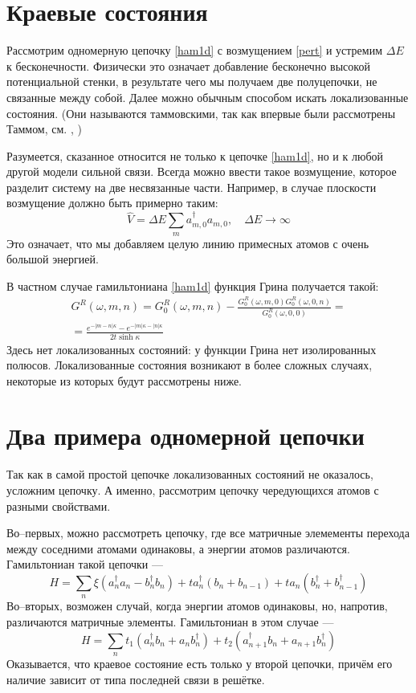 \section{Краевые состояния}
Рассмотрим одномерную цепочку \eqref{ham1d} с возмущением \eqref{pert} и устремим $\Delta E$
к бесконечности. Физически это означает добавление бесконечно высокой потенциальной стенки,
в результате чего мы получаем две полуцепочки, не связанные между собой. Далее можно 
обычным способом искать локализованные состояния. (Они называются таммовскими, так 
как впервые были рассмотрены Таммом, см. \cite{Tamm1933}, \cite{Shockley1939})

Разумеется, сказанное относится не только к цепочке \eqref{ham1d}, но и к любой другой модели
сильной связи. Всегда можно ввести такое возмущение, которое разделит систему на две
несвязанные части. Например, в случае плоскости возмущение должно быть примерно таким:
\begin{equation}
	\hat{V} = \Delta E \sum_m a^\dagger_{m,0} a_{m,0}, \quad \Delta E \to \infty
\end{equation}
Это означает, что мы добавляем целую линию примесных атомов с очень большой энергией.

В частном случае гамильтониана \eqref{ham1d} функция Грина получается такой:
\begin{multline}
	G^R(\omega, m,n) = G^R_0(\omega, m,n) - 
		\frac{G^R_0(\omega, m,0)G^R_0(\omega, 0, n)}{G^R_0(\omega,0,0)} = \\
		= \frac{e^{-|m-n|\kappa} - e^{-|m|\kappa- |n|\kappa}}{2t\sinh \kappa}
\end{multline}
Здесь нет локализованных состояний: у функции Грина нет изолированных полюсов. Локализованные
состояния возникают в более сложных случаях, некоторые из которых будут рассмотрены ниже.

\section{Два примера одномерной цепочки}
Так как в самой простой цепочке локализованных состояний не оказалось, усложним цепочку.
А именно, рассмотрим цепочку чередующихся атомов с разными свойствами. 

Во--первых, можно рассмотреть цепочку, где все матричные элемементы перехода между 
соседними атомами одинаковы, а энергии атомов различаются. Гамильтониан такой цепочки ---
\begin{equation}
	H = \sum_n \xi(a_n^\dagger a_n - b_n^\dagger b_n) + ta_n^\dagger(b_n + b_{n-1}) +
			ta_n(b_n^\dagger + b_{n-1}^\dagger)
\end{equation}
Во--вторых, возможен случай, когда энергии атомов одинаковы, но, напротив, различаются 
матричные элементы. Гамильтониан в этом случае ---
\begin{equation}
	H = \sum_n t_1(a_n^\dagger b_n + a_n b_n^\dagger) + 
		t_2 (a_{n+1}^\dagger b_n + a_{n+1} b_n^\dagger)
\end{equation}
Оказывается, что краевое состояние есть только у второй цепочки, причём его наличие 
зависит от типа последней связи в решётке.

